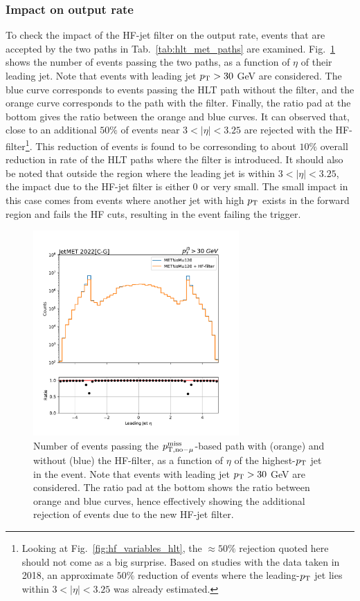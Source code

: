 \subsubsection{Impact on output rate}

To check the impact of the HF-jet filter on the output rate, events that are accepted by the two paths in Tab.~\ref{tab:hlt_met_paths} are examined. Fig.~\ref{fig:filterhf_rate}
shows the number of events passing the two paths, as a function of $\eta$ of their leading jet. Note that events with leading jet $p_{\textrm{T}} > 30$ GeV are considered. 
The blue curve corresponds to events passing the HLT path without the filter, and the orange curve corresponds to the path with the filter. Finally, the ratio pad at the bottom
gives the ratio between the orange and blue curves. It can observed that, close to an additional $50\%$ of events near $3<|\eta|<3.25$ are rejected 
with the HF-filter\footnote{Looking at Fig.~\ref{fig:hf_variables_hlt}, the $\approx 50\%$ rejection quoted here should not come as a big surprise.
Based on studies with the data taken in 2018, an approximate $50\%$ reduction of events where the leading-$p_{\textrm{T}}$ jet lies within $3 < |\eta| < 3.25$
was already estimated.}. 
This reduction of events is found to be corresonding to about $10\%$ overall reduction in rate of the HLT paths where the filter is introduced. It should also be noted that
outside the region where the leading jet is within $3 < |\eta| < 3.25$, the impact due to the HF-jet filter is either $0$ or very small. The small impact in this case comes from
events where another jet with high $p_{\textrm{T}}$ exists in the forward region and fails the HF cuts, resulting in the event failing the trigger.

\begin{figure}[htbp]
    \centering
    \includegraphics[width=0.7\textwidth]{HFFilter/merged_2023-02-10_hlt_full_JetMET_2022_run/ak4_eta0_filterhf.pdf}    
    \caption{Number of events passing the $p_{\textrm{T},\textrm{no}-\mu}^{\textrm{miss}}$-based path with (orange) and without (blue) the HF-filter, as a function of $\eta$ of the highest-$p_{\textrm{T}}$ jet in the event.
    Note that events with leading jet $p_{\textrm{T}} > 30$ GeV are considered. The ratio pad at the bottom shows the ratio between orange and blue curves, hence effectively showing the additional
    rejection of events due to the new HF-jet filter.}
    \label{fig:filterhf_rate}
\end{figure}

\clearpage